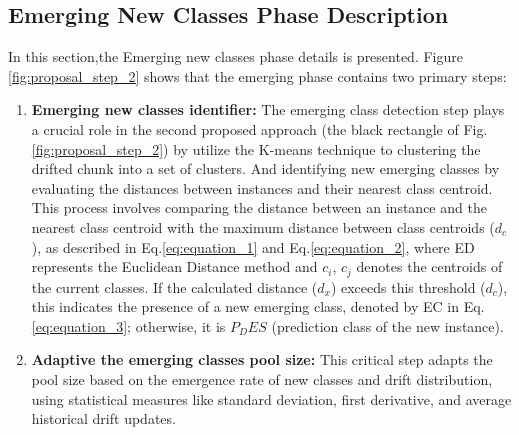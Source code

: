 \subsection{Emerging New Classes Phase Description}
\label{sec:emerging_phase}
In this section,the Emerging new classes phase details is presented. Figure \ref{fig:proposal_step_2} shows that the emerging phase contains two primary steps:
\begin{enumerate}
	\item \textbf{Emerging new classes identifier:} The emerging class detection step plays a crucial role in the second proposed approach (the black rectangle of Fig. \ref{fig:proposal_step_2}) by utilize the K-means technique to clustering the drifted chunk into a set of clusters. And identifying new emerging classes by evaluating the distances between instances and their nearest class centroid. This process involves comparing the distance between an instance and the nearest class centroid with the maximum distance between class centroids ($d_c$), as described in Eq.\ref{eq:equation_1} and Eq.\ref{eq:equation_2}, where ED represents the Euclidean Distance method and $c_i$, $c_j$ denotes the centroids of the current classes. If the calculated distance ($d_x$) exceeds this threshold ($d_c$), this indicates the presence of a new emerging class, denoted by EC in Eq. \ref{eq:equation_3}; otherwise, it is $P_DES$ (prediction class of the new instance).
	\item \textbf{Adaptive the emerging classes pool size:} This critical step adapts the pool size based on the emergence rate of new classes and drift distribution, using statistical measures like standard deviation, first derivative, and average historical drift updates.
\end{enumerate}
